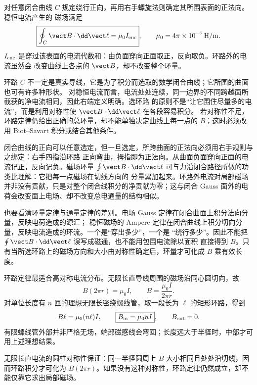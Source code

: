 对任意闭合曲线 $C$ 规定绕行正向，再用右手螺旋法则确定其所围表面的正法向。稳恒电流产生的
磁场满足
\begin{equation}
  \boxed{\oint_C\vect B\cdot\dd\vect\ell=\mu_0 I_{\rm enc}},
  \qquad
  \mu_0=4\pi\times10^{-7}\,\mathrm{H/m}.
\end{equation}
$I_{\rm enc}$ 是穿过该表面的电流代数和：由负面穿向正面取正，反向取负。环路外的电流虽然会
改变曲线上各点的 $\vect B$，却不改变整个环量。

环路 $C$ 不一定是真实导线，它是为了积分而选取的数学闭合曲线；它所围的曲面也可有许多种形状。
对稳恒电流而言，电流处处连续，同一边界的不同跨越面所截获的净电流相同，因此右端定义明确。选环路
的原则不是“让它围住尽量多的电流”，而是利用对称性使 $\vect B\cdot\dd\vect\ell$ 在各段容易积分。
若对称性不足，环路定律仍给出正确的总环量，却不能单独决定曲线上每一点的 $B$；这时必须改用
Biot--Savart 积分或结合其他条件。

闭合曲线的正向可以任意选定，但一旦选定，所跨曲面的正法向必须用右手规则与之绑定：右手四指沿环路
正向弯曲，拇指即为正法向。从曲面负面穿向正面的电流记正，反向记负。磁场环量
$\oint\vect B\cdot\dd\vect\ell$ 可与力沿闭合路径所做的功类比理解：它把每一点磁场在切线方向的
分量累加起来。环路外电流对局部磁场并非没有贡献，只是对整个闭合线积分的净贡献为零；这与闭合
Gauss 面外的电荷会改变面上电场、却不改变总电通量的结构相似。

也要看清环量定律与通量定律的差别。电场 Gauss 定律在闭合曲面上积分法向分量，反映电荷造成的源汇；
稳恒磁场的 Ampere 定律在闭合曲线上积分切向分量，反映电流造成的环流。一个是“穿出多少”，一个是
“绕行多少”。因此不能把 $\oint\vect B\cdot\dd\vect\ell$ 误写成磁通，也不能用包围电流除以面积
直接得到 $B$。只有当所选环路上的磁场方向和大小由对称性确定后，环量才可化成 $B$ 乘有效长度。

\ampereLawDiagram

环路定律最适合高对称电流分布。无限长直导线周围的磁场沿同心圆切向，故
\begin{equation}
  B(2\pi r)=\mu_0I,
  \qquad
  \boxed{B=\frac{\mu_0I}{2\pi r}}.
\end{equation}
对单位长度有 $n$ 匝的理想无限长密绕螺线管，取一段长为 $\ell$ 的矩形环路，得到
\begin{equation}
  B\ell=\mu_0(n\ell)I,
  \qquad
  \boxed{B_{\rm in}=\mu_0nI},
  \qquad B_{\rm out}=0.
\end{equation}
有限螺线管外部并非严格无场，端部磁感线会弯回；长度远大于半径时，中部才可用上述理想结果。

无限长直电流的圆柱对称性保证：同一半径圆周上 $B$ 大小相同且处处沿切线，因而环路积分才可化为
$B(2\pi r)$。如果没有这种对称性，环路定律仍然成立，却不能仅靠它求出局部磁场。

